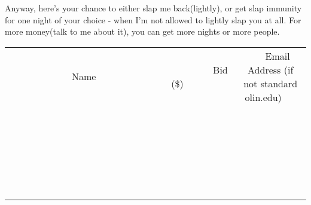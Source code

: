 \documentclass[11pt]{article}
\begin{document}
Anyway, here's your chance to either slap me back(lightly), or get slap immunity for one night of your choice - when I'm not allowed to lightly slap you at all. For more money(talk to me about it), you can get more nights or more people.
\\[6ex]
\begin{tabular}{c c c}
~~~~~~~~~~~~~Name~~~~~~~~~~~~~ & ~~~~~~~~~Bid (\$)~~~~~~~~~  & ~~~Email Address (if not standard olin.edu)~~~\\
 & & \\
\hline
 & & \\
\hline
 & & \\
\hline
 & & \\
\hline
 & & \\
\hline
 & & \\
\hline
 & & \\
\hline
 & & \\
\hline
 & & \\
\hline
 & & \\
\hline
 & & \\
\hline
 & & \\
\hline
 & & \\
\hline
 & & \\
\hline
 & & \\
\hline
 & & \\
\hline
 & & \\
\hline
 & & \\
\hline
 & & \\
\hline
 & & \\
\hline
 & & \\
\hline
 & & \\
\hline
 & & \\
\hline
 & & \\
\hline
 & & \\
\hline
 & & \\
\hline
\end{tabular}
\newpage
\end{document}
